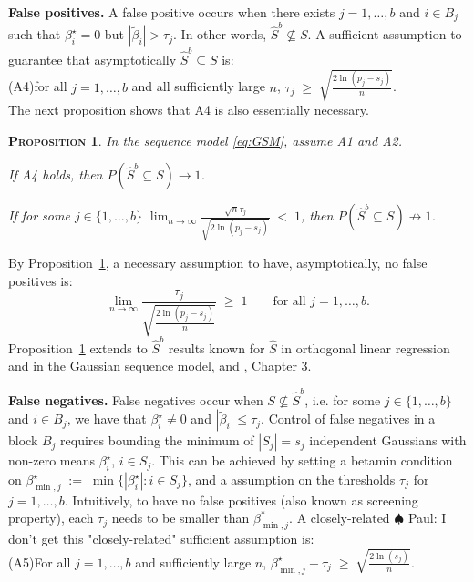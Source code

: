 \documentclass[aos]{imsart}
\theoremstyle{plain}
\newtheorem{prop}[thm]{\textsc{Proposition}}
\newcommand{\paul}[1]{{\small{\color{green} \sf $\spadesuit$ Paul: #1}}}
\begin{document}
\noindent\textbf{False positives.} 
A false positive
occurs when there exists $j=1,\ldots,b$ and $i\in B_j$ such that $\beta^\star_i=0$
but $|\tilde \beta_i|>\tau_j$. In other words, $\hat S^{b}\not\subseteq S$. A sufficient assumption to guarantee that asymptotically $\hat S^{b}\subseteq S$ is:\\[5pt]
(A4)\quad for all $j=1,\ldots,b$ and all sufficiently large $n$,\;\; $\tau_j \;\geq\;  \sqrt{\frac{{2\ln(p_j-s_j)}}{{n}}}$.
\\[5pt]
The next proposition shows that
A4 is also essentially necessary.
\begin{prop}\label{prop:suffnecIblockthresh}In the
sequence model \eqref{eq:GSM}, assume A1 and A2.
\begin{longlist}
    \item If A4 holds, then
$P(\hat{S}^{b}\subseteq S) \to 1$.\\
\item If for some $j\in\{1,\ldots,b\}$\; $
\lim_{n\to \infty} \frac{\sqrt{n}\tau_j}{\sqrt{2\ln(p_j-s_j)}} \;<\;1$,
then $P(\hat{S}^{b}\subseteq S ) \not \to 1$.
\end{longlist}
\end{prop}
By Proposition~\ref{prop:suffnecIblockthresh},
a necessary assumption to have, asymptotically, no false positives
is: 
\begin{equation}\label{cond:necIallblockthresh}
\lim_{n\to \infty} \frac{\tau_j}{\sqrt{\tfrac{2\ln(p_j-s_j)}{n}}}\;\geq\;1\qquad\mbox{for all }j=1,\ldots,b.	
\end{equation}
Proposition~\ref{prop:suffnecIblockthresh} extends to $\hat{S}^{b}$ results known for $\hat{S}$ in orthogonal linear regression \cite{ slope, buhlmannvandegeerbook, wainwrighthighdimbook} and in the Gaussian sequence model, \cite{ariascastro} and \cite{johnstone}, Chapter 3.
\bigskip

\noindent\textbf{False negatives.} 
False negatives occur when $S\not\subseteq \hat S^{b}$, i.e. for some $j \in \{1,\ldots,b\}$ and $i\in B_j$,  we have that $\beta^\star_i\neq 0$ and $|\tilde\beta_i|\leq \tau_j$.
Control of false negatives in a block $B_j$ requires bounding the minimum of $|S_j|=s_j$ independent Gaussians with non-zero means $\beta^{\star}_i$, $i\in S_j$. This can be achieved by setting a betamin condition
on $\beta_{\min,j}^{\star}\;:=\;\min\{|\beta^\star_i|: i\in S_j\}$,
and a assumption on the thresholds $\tau_j$ for $j=1,\ldots,b$.  
Intuitively, to have no false positives (also known as screening property), each $\tau_j$ needs to be smaller than $\beta^*_{\min,j}$.
A closely-related \paul{I don't get this "closely-related"} sufficient assumption is: \\[5pt]
(A5)\quad For all $j=1,\ldots,b$ and sufficiently large $n$, \;
	 $\beta_{\min,j}^{\star} - \tau_j \;\geq\; \sqrt{\frac{2\ln(s_j)}{n}}$.
\end{document}
